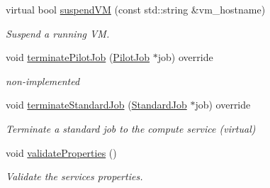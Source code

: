 \begin{DoxyCompactItemize}
virtual bool \hyperlink{classwrench_1_1_cloud_service_a8607984fbc7a852319045e2248b7a6d9}{suspend\+VM} (const std\+::string \&vm\+\_\+hostname)
\begin{DoxyCompactList}\small\item\em Suspend a running VM. \end{DoxyCompactList}\item 
void \hyperlink{classwrench_1_1_cloud_service_a6e0e6b374e18a80cdd2224235520eafd}{terminate\+Pilot\+Job} (\hyperlink{classwrench_1_1_pilot_job}{Pilot\+Job} $\ast$job) override
\begin{DoxyCompactList}\small\item\em non-\/implemented \end{DoxyCompactList}\item 
void \hyperlink{classwrench_1_1_cloud_service_a4ffac0e06760339dc333a2c859682331}{terminate\+Standard\+Job} (\hyperlink{classwrench_1_1_standard_job}{Standard\+Job} $\ast$job) override
\begin{DoxyCompactList}\small\item\em Terminate a standard job to the compute service (virtual) \end{DoxyCompactList}\item 
void \hyperlink{classwrench_1_1_cloud_service_af2d39456e9526ef63d077b76166fa1da}{validate\+Properties} ()
\begin{DoxyCompactList}\small\item\em Validate the service\textquotesingle{}s properties. \end{DoxyCompactList}\end{DoxyCompactItemize}

